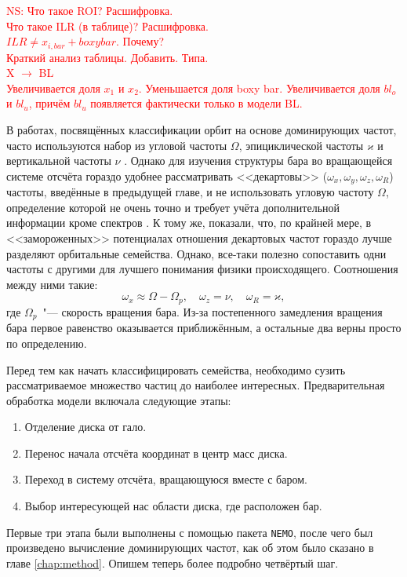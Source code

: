 \documentclass[tikz]{trlnotes}
\begin{document}
\textcolor{red}{NS: Что такое ROI? Расшифровка.\\
Что такое ILR (в таблице)? Расшифровка.\\
$ILR \neq x_{i,bar}+boxy bar$. Почему? \\
Краткий анализ таблицы. Добавить. Типа. \\ 
X $\to$ BL \\
Увеличивается доля $x_1$ и $x_2$. Уменьшается доля boxy bar. Увеличивается доля $bl_o$ и $bl_u$, причём $bl_u$ появляется фактически только в модели BL.
}

В работах, посвящённых классификации орбит на основе доминирующих частот, часто используются набор из угловой
частоты $Ω$, эпициклической частоты $ϰ$ и вертикальной частоты $ν$
\citep{athanassoula2002a,ceverino2007,voglis2007}. Однако для изучения структуры бара во вращающейся системе
отсчёта гораздо удобнее рассматривать <<декартовы>> ($ω_x, ω_y, ω_z, ω_R$) частоты, введённые в предыдущей главе, и не использовать угловую частоту $Ω$, определение которой не очень точно и требует учёта дополнительной информации кроме спектров
\citep{athanassoula2002,gajda2016}. К тому же, \citet{valluri2016} показали, что, по крайней мере, в <<замороженных>> потенциалах отношения декартовых частот
гораздо лучше разделяют орбитальные семейства. 
Однако, все-таки полезно сопоставить одни частоты с другими для лучшего понимания физики происходящего. Соотношения между ними такие: 
\[
  ω_x \approx Ω - Ω_p, \quad ω_z = ν, \quad ω_R = ϰ,
\]
где $Ω_p$~"--- скорость вращения бара. Из-за постепенного замедления вращения бара первое равенство
оказывается приближённым, а остальные два верны просто по определению.

Перед тем как начать классифицировать семейства, необходимо сузить рассматриваемое множество частиц до наиболее
интересных. Предварительная обработка модели включала следующие этапы:
\begin{enumerate}
  \item Отделение диска от гало. 
  \item Перенос начала отсчёта координат в центр масс диска.
  \item Переход в систему отсчёта, вращающуюся вместе с баром.
  \item Выбор интересующей нас области диска, где расположен бар.
\end{enumerate}
Первые три этапа были выполнены с помощью пакета \texttt{NEMO}, после чего был произведено вычисление доминирующих частот, как об этом было сказано в главе \ref{chap:method}. Опишем теперь более 
подробно четвёртый шаг.
\end{document}

